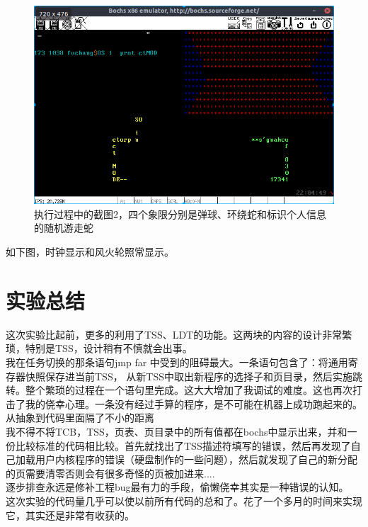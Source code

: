 \documentclass[a4paper,11pt,UTF8]{ctexart}
\newcommand{\bottomcaption}{%
\setlength{\abovecaptionskip}{6pt}%
\setlength{\belowcaptionskip}{6pt}%
\caption}
\begin{document}
	\begin{figure}[htbp]
		\centering
		\includegraphics[width=15cm]{img/3.png}
		\bottomcaption{执行过程中的截图2，四个象限分别是弹球、环绕蛇和标识个人信息的随机游走蛇}
	\end{figure}
	如下图，时钟显示和风火轮照常显示。
	

\section{实验总结}
	这次实验比起前，更多的利用了TSS、LDT的功能。这两块的内容的设计非常繁琐，特别是TSS，设计稍有不慎就会出事。\\
	\indent 我在任务切换的那条语句jmp far 中受到的阻碍最大。一条语句包含了：将通用寄存器快照保存进当前TSS， 从新TSS中取出新程序的选择子和页目录，然后实施跳转。整个繁琐的过程在一个语句里完成。这大大增加了我调试的难度。这也再次打击了我的侥幸心理。一条没有经过手算的程序，是不可能在机器上成功跑起来的。从抽象到代码里面隔了不小的距离\\
	\indent 我不得不将TCB，TSS，页表、页目录中的所有值都在bochs中显示出来，并和一份比较标准的代码相比较。首先就找出了TSS描述符填写的错误，然后再发现了自己加载用户内核程序的错误（硬盘制作的一些问题），然后就发现了自己的新分配的页需要清零否则会有很多奇怪的页被加进来....\\
	\indent 逐步排查永远是修补工程bug最有力的手段，偷懒侥幸其实是一种错误的认知。\\
	\indent 这次实验的代码量几乎可以使以前所有代码的总和了。花了一个多月的时间来实现它，其实还是非常有收获的。\\




\clearpage
\end{document}
